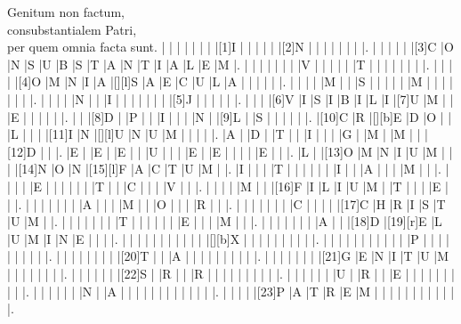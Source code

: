 \documentclass{article}
\begin{document}
\begin{Puzzle}{21}{27}
{Genitum non factum,\\ consubstantialem Patri,\\ per quem omnia facta sunt.}
|{} |{} |{} |{} |{} |{} |{} |[1]I |{} |{} |{} |{} |{} |[2]N |{} |{} |{} |{} |{} |{} |{} |.
|{} |{} |{} |{} |{} |[3]C |O |N |S |U |B |S |T |A |N |T |I |A |L |E |M |.
|{} |{} |{} |{} |{} |{} |{} |V |{} |{} |{} |{} |{} |T |{} |{} |{} |{} |{} |{} |{} |.
|{} |{} |{} |{} |[4]O |M |N |I |A |[][l]S |A |E |C |U |L |A |{} |{} |{} |{} |{} |.
|{} |{} |{} |{} |M |{} |{} |S |{} |{} |{} |{} |{} |M |{} |{} |{} |{} |{} |{} |{} |.
|{} |{} |{} |{} |N |{} |{} |I |{} |{} |{} |{} |{} |{} |{} |[5]J |{} |{} |{} |{} |{} |.
|{} |{} |{} |[6]V |I |S |I |B |I |L |I |[7]U |M |{} |{} |E |{} |{} |{} |{} |{} |.
|{} |{} |[8]D |{} |P |{} |{} |I |{} |{} |{} |N |{} |[9]L |{} |S |{} |{} |{} |{} |{} |.
|[10]C |R |[][b]E |D |O |{} |{} |L |{} |{} |{} |[11]I |N |[][l]U |N |U |M |{} |{} |{} |{} |.
|A |{} |D |{} |T |{} |{} |I |{} |{} |{} |G |{} |M |{} |M |{} |{} |[12]D |{} |{} |.
|E |{} |E |{} |E |{} |{} |U |{} |{} |{} |E |{} |E |{} |{} |{} |{} |E |{} |{} |.
|L |{} |[13]O |M |N |I |U |M |{} |{} |{} |[14]N |O |N |[15][l]F |A |C |T |U |M |{} |.
|I |{} |{} |{} |T |{} |{} |{} |{} |{} |{} |I |{} |{} |A |{} |{} |{} |M |{} |{} |.
|{} |{} |{} |{} |E |{} |{} |{} |{} |{} |{} |T |{} |{} |C |{} |{} |{} |V |{} |{} |.
|{} |{} |{} |{} |M |{} |{} |[16]F |I |L |I |U |M |{} |T |{} |{} |{} |E |{} |{} |.
|{} |{} |{} |{} |{} |{} |{} |A |{} |{} |{} |M |{} |{} |O |{} |{} |{} |R |{} |{} |.
|{} |{} |{} |{} |{} |{} |{} |C |{} |{} |{} |{} |[17]C |H |R |I |S |T |U |M |{} |.
|{} |{} |{} |{} |{} |{} |{} |T |{} |{} |{} |{} |{} |{} |E |{} |{} |{} |M |{} |{} |.
|{} |{} |{} |{} |{} |{} |{} |A |{} |{} |[18]D |[19][r]E |L |U |M |I |N |E |{} |{} |{} |.
|{} |{} |{} |{} |{} |{} |{} |{} |{} |{} |{} |[][b]X |{} |{} |{} |{} |{} |{} |{} |{} |{} |.
|{} |{} |{} |{} |{} |{} |{} |{} |{} |{} |{} |P |{} |{} |{} |{} |{} |{} |{} |{} |{} |.
|{} |{} |{} |{} |{} |{} |{} |{} |[20]T |{} |{} |A |{} |{} |{} |{} |{} |{} |{} |{} |{} |.
|{} |{} |{} |{} |{} |{} |{} |[21]G |E |N |I |T |U |M |{} |{} |{} |{} |{} |{} |{} |.
|{} |{} |{} |{} |{} |{} |[22]S |{} |R |{} |{} |R |{} |{} |{} |{} |{} |{} |{} |{} |{} |.
|{} |{} |{} |{} |{} |{} |U |{} |R |{} |{} |E |{} |{} |{} |{} |{} |{} |{} |{} |{} |.
|{} |{} |{} |{} |{} |{} |N |{} |A |{} |{} |{} |{} |{} |{} |{} |{} |{} |{} |{} |{} |.
|{} |{} |{} |{} |[23]P |A |T |R |E |M |{} |{} |{} |{} |{} |{} |{} |{} |{} |{} |{} |.
\end{Puzzle}



\PuzzleSolution
\end{document}
